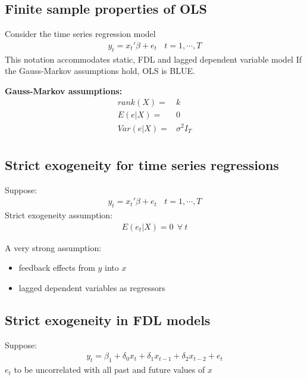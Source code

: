 \documentclass[a4paper,twoside,11pt]{article}
\begin{document}
\subsection{Finite sample properties of OLS} 
\noindent Consider the time series regression model
\begin{equation*}
\begin{aligned}
    y_t = x_t' \beta + e_t \ \ \ \ t=1,\cdots, T
\end{aligned}
\end{equation*}
This notation accommodates static, FDL and lagged dependent variable model
\newline
\textcolor{NavyBlue}{If the Gauss-Markov assumptions hold, OLS is BLUE.}
\begin{shaded*}
\noindent \textbf{Gauss-Markov assumptions:}
\begin{equation*}
\begin{aligned}
        rank (X) =& k \\
        E(e|X) =& 0 \\
        Var(e|X) =& \sigma^2 I_T \\
\end{aligned}
\end{equation*}
\end{shaded*}
\subsection{Strict exogeneity for time series regressions}
Suppose:
\begin{equation*}
\begin{aligned}
y_t = x_t'\beta + e_t \ \ \ \ t=1,\cdots, T
\end{aligned}
\end{equation*}
Strict exogeneity assumption:
\begin{equation*}
\begin{aligned}
    E(e_t|X)=0 \ \ \forall \ t
\end{aligned}
\end{equation*}
\textcolor{NavyBlue}{A very strong assumption: 
\begin{itemize}
    \item feedback effects from $y$ into $x$
    \item lagged dependent variables as regressors
\end{itemize}}
\subsection{Strict exogeneity in FDL models} 
Suppose: 
\begin{equation*}
\begin{aligned}
    y_t = \beta_1 + \delta_0 x_t + \delta_1 x_{t-1} + \delta_2 x_{t-2} + e_t
\end{aligned}
\end{equation*}
\textcolor{NavyBlue}{$e_t$ to be uncorrelated with all past and future values of $x$}
\end{document}
